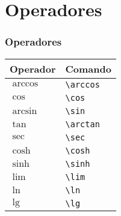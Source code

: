 \documentclass[brazilian]{beamer}
\begin{document}
\section{Operadores}
\begin{frame}[fragile]
    \frametitle{Operadores}

    \begin{table}
        \begin{tabular}{O{2cm}l}
            Operador & Comando \\ \hline
            \(\arccos \) & \lstinline[style=myStyleLatex]!\arccos ! \\ \hline
            \(\cos \) & \lstinline[style=myStyleLatex]!\cos ! \\ \hline
            \(\arcsin \) & \lstinline[style=myStyleLatex]!\sin ! \\ \hline
            \(\tan \) & \lstinline[style=myStyleLatex]!\arctan ! \\ \hline
            \(\sec \) & \lstinline[style=myStyleLatex]!\sec ! \\ \hline
            \(\cosh \) & \lstinline[style=myStyleLatex]!\cosh ! \\ \hline
            \(\sinh \) & \lstinline[style=myStyleLatex]!\sinh ! \\ \hline
            \(\lim \) & \lstinline[style=myStyleLatex]!\lim ! \\ \hline
            \(\ln \) & \lstinline[style=myStyleLatex]!\ln ! \\ \hline
            \(\lg \) & \lstinline[style=myStyleLatex]!\lg ! \\ \hline
        \end{tabular}
    \end{table}

\end{frame}
\end{document}
